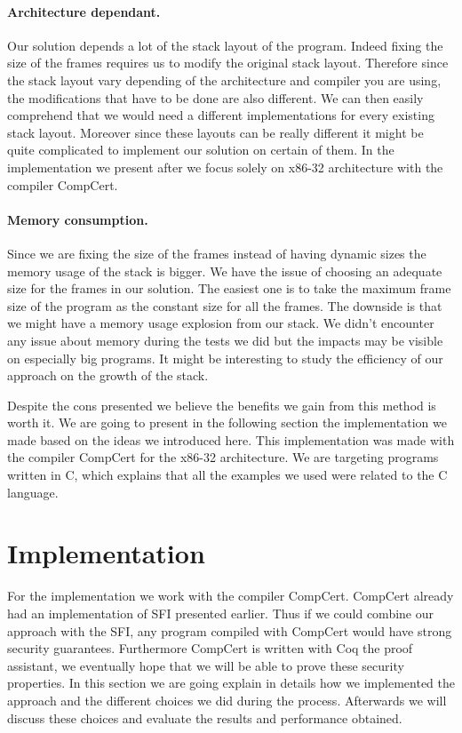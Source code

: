 \documentclass[11pt]{sdm}
\begin{document}
\paragraph{Architecture dependant.}
\label{par:Architecture dependant}
Our solution depends a lot of the stack layout of the program.
Indeed fixing the size of the frames requires us to modify the original stack layout.
Therefore since the stack layout vary depending of the architecture and compiler you are using, the modifications that have to be done are also different.
We can then easily comprehend that we would need a different implementations for every existing stack layout.
Moreover since these layouts can be really different it might be quite complicated to implement our solution on certain of them.
In the implementation we present after we focus solely on x86-32 architecture with the compiler CompCert.

\paragraph{Memory consumption.}
\label{par:Memory consumption}
Since we are fixing the size of the frames instead of having dynamic sizes the memory usage of the stack is bigger. We have the issue of choosing an adequate size for the frames in our solution. The easiest one is to take the maximum frame size of the program as the constant size for all the frames. The downside is that we might have a memory usage explosion from our stack.
We didn't encounter any issue about memory during the tests we did but the impacts may be visible on especially big programs. It might be interesting to study the efficiency of our approach on the growth of the stack.

Despite the cons presented we believe the benefits we gain from this method is worth it.
We are going to present in the following section the implementation we made based on the ideas we introduced here. This implementation was made with the compiler CompCert for the x86-32 architecture. We are targeting programs written in C, which explains that all the examples we used were related to the C language.


\newpage
\section{Implementation}
\label{sec:implementation}

For the implementation we work with the compiler CompCert. CompCert already had an implementation of SFI presented earlier. Thus if we could combine our approach with the SFI, any program compiled with CompCert would have strong security guarantees. Furthermore CompCert is written with Coq the proof assistant, we eventually hope that we will be able to prove these security properties. In this section we are going explain in details how we implemented the approach and the different choices we did during the process. Afterwards we will discuss these choices and evaluate the results and performance obtained.
\end{document}
